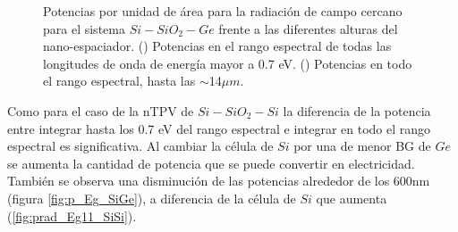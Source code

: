 \begin{figure}[H]
\begin{subfigure}[b]{0.49\textwidth}
	\caption{ }
	\label{fig:p_full_SiGe}
\end{subfigure}
	\caption[Potencias por unidad de área para la radiación de campo cercano para el sistema $Si-SiO_2-Ge$ frente a las diferentes alturas del nano-espaciador]{Potencias por unidad de área para la radiación de campo cercano para el sistema $Si-SiO_2-Ge$ frente a las diferentes alturas del nano-espaciador. () Potencias en el rango espectral de todas las longitudes de onda de energía mayor a 0.7 eV. () Potencias en todo el rango espectral, hasta las $\sim$14$\mu m$.}
	\label{fig:p_SiGe}
\end{figure}
Como para el caso de la nTPV de $Si-SiO_2-Si$ la diferencia de la potencia entre integrar hasta los 0.7 eV del rango espectral e integrar en todo el rango espectral es significativa. Al cambiar la célula de $Si$ por una de menor BG de $Ge$ se aumenta la cantidad de potencia que se puede convertir en electricidad. También se observa una disminución de las potencias alrededor de los 600nm (figura \ref{fig:p_Eg_SiGe}), a diferencia de la célula de $Si$ que aumenta (\ref{fig:prad_Eg11_SiSi}).
